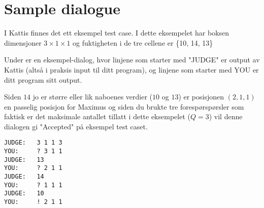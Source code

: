 \section*{Sample dialogue}
I Kattis finnes det ett eksempel test case.
I dette eksempelet har boksen dimensjoner $3\times 1\times 1$ og fuktigheten i de tre cellene er \{10, 14, 13\}

Under er en eksempel-dialog, hvor linjene som starter med "JUDGE" er output av Kattis (altså i praksis input til ditt program), og linjene som starter med YOU er ditt program sitt output.

Siden $14$ jo er større eller lik naboenes verdier ($10$ og $13$) er posisjonen $(2,1,1)$ en passelig posisjon for Maximus og siden du brukte tre forespørspørsler som faktisk er det maksimale antallet tillatt i dette eksempelet ($Q = 3$) vil denne dialogen gi "Accepted" på eksempel test caset.

\begin{verbatim}
JUDGE:   3 1 1 3
YOU:     ? 3 1 1
JUDGE:   13
YOU:     ? 2 1 1
JUDGE:   14
YOU:     ? 1 1 1
JUDGE:   10
YOU:     ! 2 1 1
\end{verbatim}
